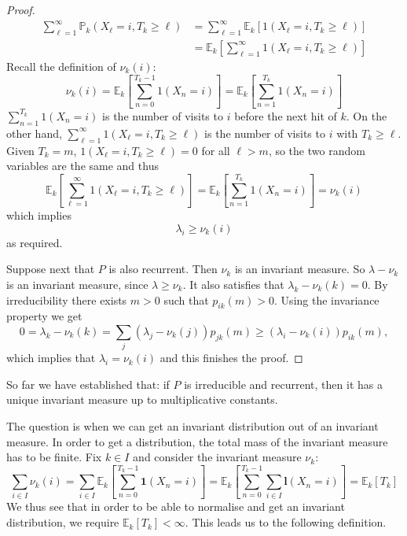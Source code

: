 \documentclass[a4paper,11pt]{article}
\begin{document}
\begin{proof}
\begin{align*}
        \sum_{\ell=1}^{\infty} \mathbb{P}_k\left(X_{\ell}=i, T_k \geq \ell\right) &= \sum_{\ell=1}^{\infty} \mathbb{E}_k\left[ 1(X_{\ell}=i, T_k \geq \ell) \right]\\ 
        &= \mathbb{E}_k\left[ \sum_{\ell=1}^{\infty} 1(X_{\ell}=i, T_k \geq \ell) \right]
    \end{align*}
    Recall the definition of $\nu_k(i)$: 
    \[
        \nu_k(i)=\mathbb{E}_k\left[\sum_{n=0}^{T_k-1} 1\left(X_n=i\right)\right]=\mathbb{E}_k\left[\sum_{n=1}^{T_k} 1\left(X_n=i\right)\right]
    \]
    $ \sum_{n=1}^{T_k} 1\left(X_n=i\right) $ is the number of visits to $i$ before the next hit of $k$. On the other hand, $\sum_{\ell=1}^{\infty} 1(X_{\ell}=i, T_k \geq \ell)$ is the number of visits to $i$ with $ T_k\ge \ell $. Given $T_k=m$, $ 1(X_{\ell}=i, T_k \geq \ell)=0 $ for all $\ell > m$, so the two random variables are the same and thus 
    \[
        \mathbb{E}_k\left[ \sum_{\ell=1}^{\infty} 1(X_{\ell}=i, T_k \geq \ell) \right] = \mathbb{E}_k\left[\sum_{n=1}^{T_k} 1\left(X_n=i\right)\right] = \nu_k(i)
    \]
    which implies 
    \[
        \lambda_i\ge \nu_k(i)
    \]
    as required. 

    Suppose next that $P$ is also recurrent. Then $\nu_k$ is an invariant measure. So $\lambda-\nu_k$ is an invariant measure, since $\lambda \geq \nu_k$. It also satisfies that $\lambda_k-\nu_k(k)=0$. By irreducibility there exists $m>0$ such that $p_{i k}(m)>0$. Using the invariance property we get
    \[
    0=\lambda_k-\nu_k(k)=\sum_j\left(\lambda_j-\nu_k(j)\right) p_{j k}(m) \geq\left(\lambda_i-\nu_k(i)\right) p_{i k}(m),
    \]
    which implies that $\lambda_i=\nu_k(i)$ and this finishes the proof.
\end{proof}

So far we have established that: if $P$ is irreducible and recurrent, then it has a unique invariant measure up to multiplicative constants. 

The question is when we can get an invariant distribution out of an invariant measure. In order to get a distribution, the total mass of the invariant measure has to be finite. Fix $k \in I$ and consider the invariant measure $\nu_k$:
\[
\sum_{i \in I} \nu_k(i)=\sum_{i \in I} \mathbb{E}_k\left[\sum_{n=0}^{T_k-1} \mathbf{1}\left(X_n=i\right)\right]=\mathbb{E}_k\left[\sum_{n=0}^{T_k-1} \sum_{i \in I} \mathbf{l}\left(X_n=i\right)\right]=\mathbb{E}_k\left[T_k\right]
\]
We thus see that in order to be able to normalise and get an invariant distribution, we require $\mathbb{E}_k\left[T_k\right]<\infty$. This leads us to the following definition.
\end{document}
